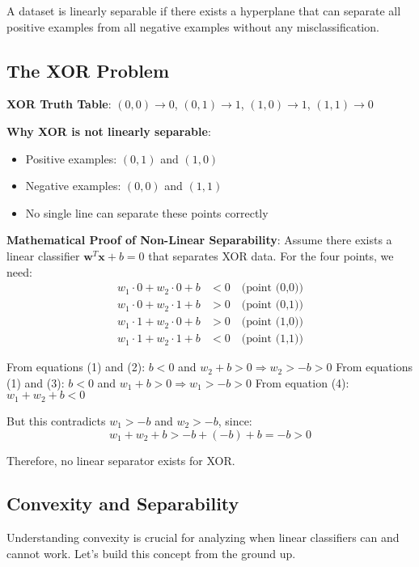 \begin{definition}
A dataset is linearly separable if there exists a hyperplane that can separate all positive examples from all negative examples without any misclassification.
\end{definition}

\subsection{The XOR Problem}
\textbf{XOR Truth Table}: $(0,0) \rightarrow 0$, $(0,1) \rightarrow 1$, $(1,0) \rightarrow 1$, $(1,1) \rightarrow 0$

\textbf{Why XOR is not linearly separable}:
\begin{itemize}
    \item Positive examples: $(0,1)$ and $(1,0)$
    \item Negative examples: $(0,0)$ and $(1,1)$
    \item No single line can separate these points correctly
\end{itemize}

\textbf{Mathematical Proof of Non-Linear Separability}:
Assume there exists a linear classifier \(\mathbf{w}^T \mathbf{x} + b = 0\) that separates XOR data.
For the four points, we need:
\begin{align}
w_1 \cdot 0 + w_2 \cdot 0 + b &< 0 \quad \text{(point (0,0))} \\
w_1 \cdot 0 + w_2 \cdot 1 + b &> 0 \quad \text{(point (0,1))} \\
w_1 \cdot 1 + w_2 \cdot 0 + b &> 0 \quad \text{(point (1,0))} \\
w_1 \cdot 1 + w_2 \cdot 1 + b &< 0 \quad \text{(point (1,1))}
\end{align}

From equations (1) and (2): \(b < 0\) and \(w_2 + b > 0 \Rightarrow w_2 > -b > 0\)
From equations (1) and (3): \(b < 0\) and \(w_1 + b > 0 \Rightarrow w_1 > -b > 0\)
From equation (4): \(w_1 + w_2 + b < 0\)

But this contradicts \(w_1 > -b\) and \(w_2 > -b\), since:
\[w_1 + w_2 + b > -b + (-b) + b = -b > 0\]

Therefore, no linear separator exists for XOR.

\subsection{Convexity and Separability}

Understanding convexity is crucial for analyzing when linear classifiers can and cannot work. Let's build this concept from the ground up.

